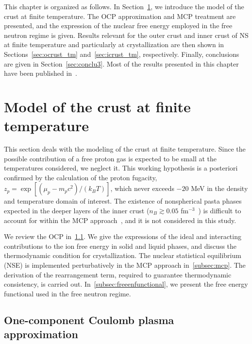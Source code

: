This chapter is organized as follows. In Section~\ref{sec:modelcrusttemp}, we
introduce the model of the crust at finite temperature. The OCP approximation 
and MCP treatment are presented, and the expression of the nuclear free energy 
employed in the free neutron regime is given. 
Results relevant for the outer crust and inner crust of NS at finite 
temperature and particularly at crystallization are then shown in 
Sections~\ref{sec:ocrust_tm} and~\ref{sec:icrust_tm}, respectively.
Finally, conclusions are given in Section~\ref{sec:conclu3}.
Most of the results presented in this chapter have been 
published in~\cite{Fantina2020,Carreau2019,Carreau2020}.

\minitoc\newpage

\section{Model of the crust at finite temperature}\label{sec:modelcrusttemp}

This section deals with the modeling of the crust at finite temperature. 
Since the possible contribution of a free proton gas is expected to be small at 
the temperatures considered, we neglect it. This working hypothesis 
is a posteriori confirmed by the calculation of the proton fugacity, 
$z_p = \exp[(\mu_p-m_pc^2)/(k_B T)]$, which never exceeds $-20$ MeV in 
the density and temperature domain of interest. 
The existence of nonspherical pasta phases expected in the deeper layers of the 
inner crust ($n_B \gtrsim 0.05$ fm$^{-3}$~\cite{Pearson2020}) is difficult to 
account for within the MCP approach~\cite{Barros2020}, and 
it is not considered in this study.

We review the OCP in~\ref{subsec:ocp}. 
We give the expressions of the ideal and interacting
contributions to the ion free energy in solid and liquid phases, and discuss 
the thermodynamic condition for crystallization. The nuclear statistical
equilibrium (NSE) is implemented perturbatively in the MCP approach 
in~\ref{subsec:mcp}. The derivation of the rearrangement term, 
required to guarantee thermodynamic consistency, is carried out.
In~\ref{subsec:freeenfunctional}, we present the free energy functional used in
the free neutron regime.

\subsection{One-component Coulomb plasma approximation}\label{subsec:ocp}

